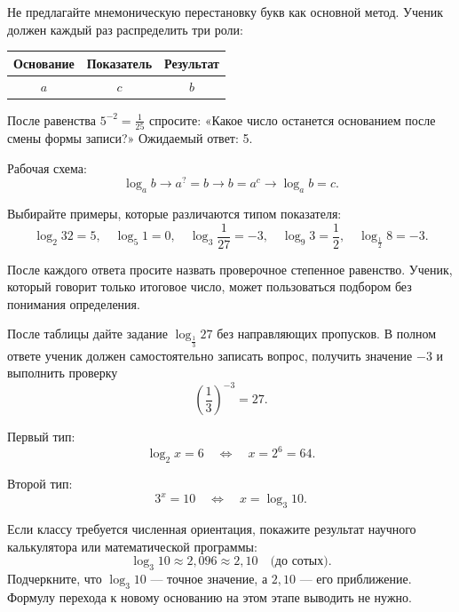 
Не предлагайте мнемоническую перестановку букв как основной метод. Ученик
должен каждый раз распределить три роли:

\begin{center}
  \renewcommand{\arraystretch}{1.3}
  \begin{tabular}{ccc}
    \toprule
    \rowcolor{TableHeader}
    Основание & Показатель & Результат \\
    \midrule
    \(a\) & \(c\) & \(b\) \\
    \bottomrule
  \end{tabular}
\end{center}

После равенства \(5^{-2}=\frac1{25}\) спросите:
«Какое число останется основанием после смены формы записи?»
Ожидаемый ответ: 5.


Рабочая схема:
\[
  \log_a b
  \longrightarrow
  a^{?}=b
  \longrightarrow
  b=a^c
  \longrightarrow
  \log_a b=c.
\]

Выбирайте примеры, которые различаются типом показателя:
\[
  \log_2 32=5,
  \quad
  \log_5 1=0,
  \quad
  \log_3\frac1{27}=-3,
  \quad
  \log_9 3=\frac12,
  \quad
  \log_{\frac12}8=-3.
\]

\begin{teacherbox}
  После каждого ответа просите назвать проверочное степенное равенство.
  Ученик, который говорит только итоговое число, может пользоваться
  подбором без понимания определения.
\end{teacherbox}

После таблицы дайте задание \(\log_{\frac13}27\) без направляющих
пропусков. В полном ответе ученик должен самостоятельно записать вопрос,
получить значение \(-3\) и выполнить проверку
\[
  \left(\frac13\right)^{-3}=27.
\]


Первый тип:
\[
  \log_2 x=6
  \quad\Longleftrightarrow\quad
  x=2^6=64.
\]

Второй тип:
\[
  3^x=10
  \quad\Longleftrightarrow\quad
  x=\log_3 10.
\]

Если классу требуется численная ориентация, покажите результат научного
калькулятора или математической программы:
\[
  \log_3 10\approx2{,}096\approx2{,}10
  \quad\text{(до сотых)}.
\]
Подчеркните, что \(\log_3 10\) --- точное значение, а \(2{,}10\) --- его
приближение. Формулу перехода к новому основанию на этом этапе выводить не
нужно.

